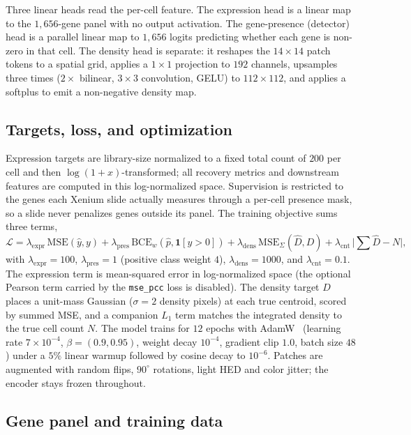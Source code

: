 \documentclass[11pt]{article}
\begin{document}
Three linear heads read the per-cell feature. The expression head is a linear
map to the $1{,}656$-gene panel with no output activation. The gene-presence
(detector) head is a parallel linear map to $1{,}656$ logits predicting whether
each gene is non-zero in that cell. The density head is separate: it reshapes
the $14\times14$ patch tokens to a spatial grid, applies a $1\times1$ projection
to $192$ channels, upsamples three times ($2\times$ bilinear, $3\times3$
convolution, GELU) to $112\times112$, and applies a softplus to emit a
non-negative density map.

\subsection{Targets, loss, and optimization}
\label{met:loss}

Expression targets are library-size normalized to a fixed total count of $200$
per cell and then $\log(1+x)$-transformed; all recovery metrics and downstream
features are computed in this log-normalized space. Supervision is restricted to
the genes each Xenium slide actually measures through a per-cell presence mask,
so a slide never penalizes genes outside its panel. The training objective sums
three terms,
\[
\mathcal{L}=\lambda_{\mathrm{expr}}\,\mathrm{MSE}(\hat y,y)
+\lambda_{\mathrm{pres}}\,\mathrm{BCE}_{w}(\hat p,\mathbf{1}[y>0])
+\lambda_{\mathrm{dens}}\,\mathrm{MSE}_{\Sigma}(\hat D,D)
+\lambda_{\mathrm{cnt}}\,\lvert\textstyle\sum\hat D-N\rvert,
\]
with $\lambda_{\mathrm{expr}}=100$, $\lambda_{\mathrm{pres}}=1$ (positive class
weight $4$), $\lambda_{\mathrm{dens}}=1000$, and $\lambda_{\mathrm{cnt}}=0.1$.
The expression term is mean-squared error in log-normalized space (the optional
Pearson term carried by the \texttt{mse\_pcc} loss is disabled). The density
target $D$ places a unit-mass Gaussian ($\sigma=2$ density pixels) at each true
centroid, scored by summed MSE, and a companion $L_1$ term matches the integrated
density to the true cell count $N$. The model trains for $12$ epochs with AdamW~\cite{adamw}
(learning rate $7\times10^{-4}$, $\beta=(0.9,0.95)$, weight decay $10^{-4}$,
gradient clip $1.0$, batch size $48$) under a $5\%$ linear warmup followed by
cosine decay to $10^{-6}$. Patches are augmented with random flips, $90^{\circ}$
rotations, light HED and color jitter; the encoder stays frozen throughout.

\subsection{Gene panel and training data}
\label{met:data}
\end{document}
